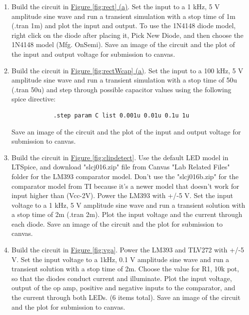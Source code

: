 \begin{enumerate}
	\item Build the circuit in \hyperref[fig:rect]{Figure \ref*{fig:rect} (a)}. Set the input to a 1 kHz, 5 V amplitude sine wave and run a transient simulation with a stop time of 1m (.tran 1m) and plot the input and output.  To use the 1N4148 diode model, right click on the diode after placing it, Pick New Diode, and then choose the 1N4148 model (Mfg. OnSemi). Save an image of the circuit and the plot of the input and output voltage for submission to canvas. \label{itm:8ssec1itm1}
	\item Build the circuit in \hyperref[fig:rectWcap]{Figure \ref*{fig:rectWcap} (a)}. Set the input to a 100 kHz, 5 V amplitude sine wave and run a transient simulation with a stop time of 50u (.tran 50u) and step through possible capacitor values using the following spice directive:
			\begin{verbatim}
			.step param C list 0.001u 0.01u 0.1u 1u
		\end{verbatim}
	 Save an image of the circuit and the plot of the input and output voltage for submission to canvas. \label{itm:8ssec1itm2}
	\item Build the circuit in \hyperref[fig:clipdetect]{Figure \ref*{fig:clipdetect}}. Use the default LED model in LTSpice, and download "slcj016.zip" file from Canvas "Lab Related Files" folder for the LM393 comparator model. Don't use the  "slcj016b.zip" for the comparator model from TI because it's a newer model that doesn't work for input higher than (Vcc-2V). Power the LM393 with +/-5 V. Set the input voltage to a 1 kHz, 5 V amplitude sine wave and run a transient solution with a stop time of 2m (.tran 2m). Plot the input voltage and the current through each diode. Save an image of the circuit and the plot for submission to canvas. \label{itm:8ssec1itm3}
	\item Build the circuit in \hyperref[fig:vga]{Figure \ref*{fig:vga}}. Power the LM393 and TLV272 with  +/-5 V. Set the input voltage to a 1kHz, 0.1 V amplitude sine wave and run a transient solution with a stop time of 2m. Choose the value for R1, 10k pot, so that the diodes conduct current and illuminate. Plot the input voltage, output of the op amp, positive and negative inputs to the comparator, and the current through both LEDs. (6 items total). Save an image of the circuit and the plot for submission to canvas. \label{itm:8ssec1itm4}
\end{enumerate}

